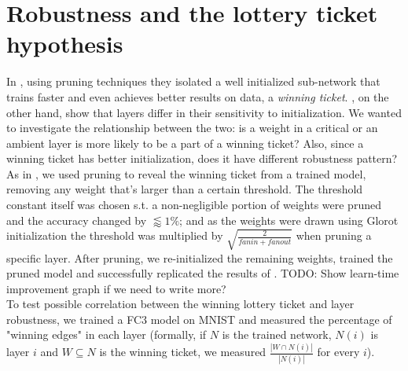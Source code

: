 \documentclass{article}
\begin{document}
\section{Robustness and the lottery ticket hypothesis} \label{winnerySection}
    
In \cite{frankle2018lottery}, using pruning techniques they isolated a well initialized sub-network that trains faster and even achieves better results on data, a \emph{winning ticket}. \cite{allLayers}, on the other hand, show that layers differ in their sensitivity to initialization. We wanted to investigate the relationship between the two: is a weight in a critical or an ambient layer is more likely to be a part of a winning ticket? Also, since a winning ticket has better initialization, does it have different robustness pattern? \\
As in \cite{frankle2018lottery}, we used pruning to reveal the winning ticket from a trained model, removing any weight that's larger than a certain threshold. The threshold constant itself was chosen s.t. a non-negligible portion of weights were pruned and the accuracy changed by $\lessapprox 1\%$; and as the weights were drawn using Glorot initialization the threshold was multiplied by $\sqrt{\frac{2}{fanin + fanout}}$ when pruning a specific layer. After pruning, we re-initialized the remaining weights, trained the pruned model and successfully replicated the results of \cite{frankle2018lottery}. TODO: Show learn-time improvement graph if we need to write more?\\
To test possible correlation between the winning lottery ticket and layer robustness, we trained a FC3 model on MNIST and measured the percentage of "winning edges" in each layer (formally, if $N$ is the trained network, $N(i)$ is layer $i$ and $W\subseteq N$ is the winning ticket, we measured $\frac{|W\cap N(i)|}{|N(i)|}$ for every $i$).\\
\end{document}

